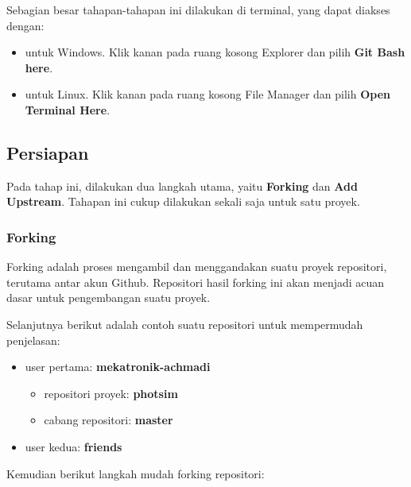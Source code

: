 \documentclass[12pt]{article}
\begin{document}
	Sebagian besar tahapan-tahapan ini dilakukan di terminal, yang dapat diakses dengan:
	\begin{itemize}
		\item untuk Windows. Klik kanan pada ruang kosong Explorer dan pilih \textbf{Git Bash here}.
		\item untuk Linux. Klik kanan pada ruang kosong File Manager dan pilih \textbf{Open Terminal Here}.  
	\end{itemize}

	\subsection{Persiapan}
	
	Pada tahap ini, dilakukan dua langkah utama, yaitu \textbf{Forking} dan \textbf{Add Upstream}.
	Tahapan ini cukup dilakukan sekali saja untuk satu proyek. 
	
	\subsubsection{Forking}
	
	Forking adalah proses mengambil dan menggandakan suatu proyek repositori, terutama antar akun Github.
	Repositori hasil forking ini akan menjadi acuan dasar untuk pengembangan suatu proyek.
	
	Selanjutnya berikut adalah contoh suatu repositori untuk mempermudah penjelasan:
	\begin{itemize}
		\item user pertama: \textbf{mekatronik-achmadi}
		\begin{itemize}
			\item repositori proyek: \textbf{photsim}
			\item cabang repositori: \textbf{master}	 
		\end{itemize}
		\item user kedua: \textbf{friends} 
	\end{itemize}

	Kemudian berikut langkah mudah forking repositori:
	
\end{document}
